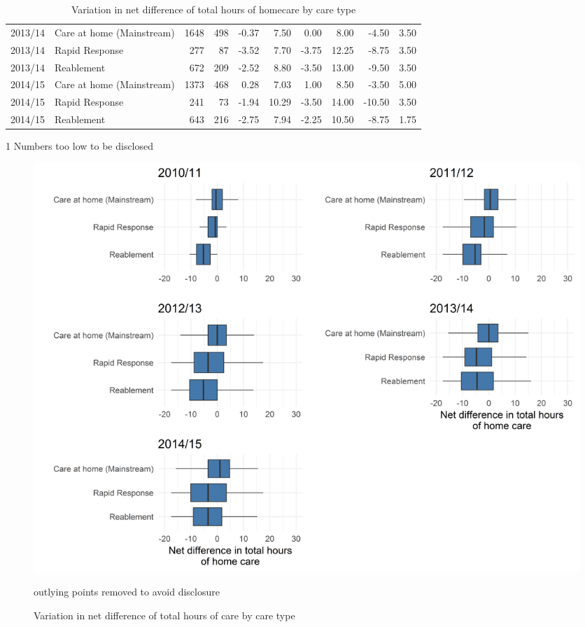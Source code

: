 \documentclass[]{article}
\begin{document}
\begin{table}[h]
{\begin{threeparttable}
\begin{tabular}{@{}llrrrrrrrr@{}}
2013/14 & Care at home (Mainstream) & 1648 & 498 & -0.37 & 7.50 & 0.00 & 8.00 & -4.50 & 3.50 \\
2013/14 & Rapid Response & 277 & 87 & -3.52 & 7.70 & -3.75 & 12.25 & -8.75 & 3.50 \\
2013/14 & Reablement & 672 & 209 & -2.52 & 8.80 & -3.50 & 13.00 & -9.50 & 3.50 \\
2014/15 & Care at home (Mainstream) & 1373 & 468 & 0.28 & 7.03 & 1.00 & 8.50 & -3.50 & 5.00 \\
2014/15 & Rapid Response & 241 & 73 & -1.94 & 10.29 & -3.50 & 14.00 & -10.50 & 3.50 \\
2014/15 & Reablement & 643 & 216 & -2.75 & 7.94 & -2.25 & 10.50 & -8.75 & 1.75 \\ \bottomrule
\end{tabular}
\begin{tablenotes}
\item[1] Numbers too low to be disclosed
\end{tablenotes}
\end{threeparttable}%
}
\caption{Variation in net difference of total hours of homecare by care type}
\label{tab:renf-net-diff}
\end{table}

\begin{figure}[]
  \centering
    \includegraphics[]{figures/chapter-renf/10-net-diff-plot.png}
    \caption{Variation in net difference of total hours of care by care type}
    {\scriptsize outlying points removed to avoid disclosure}
    \label{fig:renf-net-diff}
\end{figure}
\end{document}
